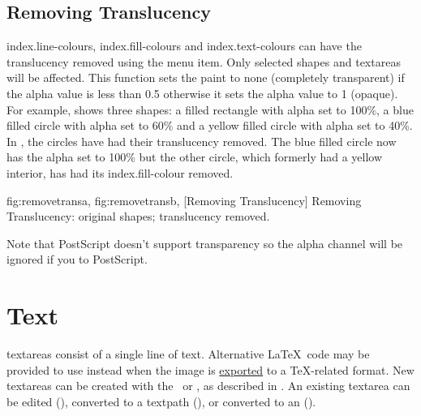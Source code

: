 
\section{Removing Translucency}\label{sec:removetrans}


\Glspl{index.line-colour}, \glspl{index.fill-colour} and
\glspl{index.text-colour} can have the translucency removed using
the  menu item. Only selected
\glspl{shape} and \glspl{textarea} will be affected. This function
sets the paint to none (completely transparent) if the alpha value
is less than 0.5 otherwise it sets the alpha value to 1 (opaque).
For example,  shows three shapes: a
filled rectangle with alpha set to 100\%, a blue filled circle with
alpha set to 60\% and a yellow filled circle with alpha set to 40\%.
In , the circles have had their
translucency removed. The blue filled circle now has the alpha set
to 100\% but the other circle, which formerly had a yellow interior,
has had its \gls{index.fill-colour} removed.

{
 {fig:removetransa}{}{},
 {fig:removetransb}{}{},
}
[Removing Translucency]
{Removing Translucency:  original shapes;
   translucency removed.}

\begin{warning}
Note that PostScript doesn't support transparency so the
alpha channel will be ignored if you  to PostScript.
\end{warning}


\chapter{Text}\label{sec:text}

\Glspl{textarea} consist of a single line of text. Alternative
\LaTeX\ code may be provided to use instead when the image
is \hyperref[sec:exportimage]{exported} to a \TeX-related format.
New \glspl{textarea} can be created with the
\texttool\ or \mathstool, as described in .
An existing \gls{textarea} can be edited (),
converted to a \gls{textpath} (), or
converted to an  ().

